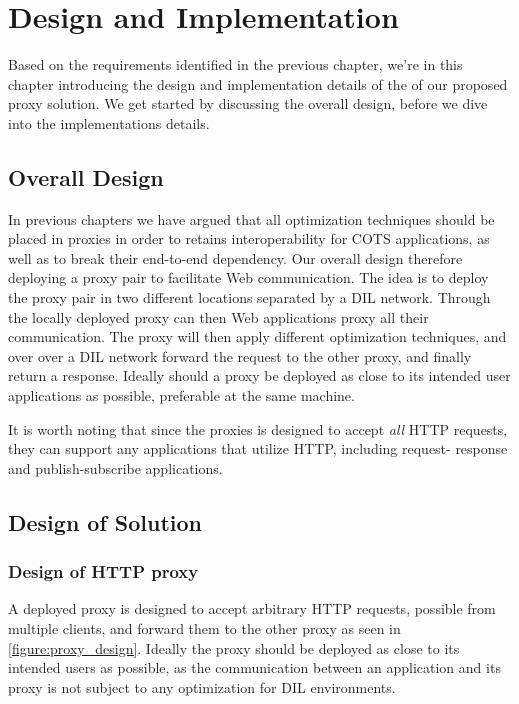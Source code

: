 \chapter{Design and Implementation}
\label{chapter:design}

Based on the requirements identified in the previous chapter, we're in this chapter introducing the design and implementation details of the of our proposed proxy solution. We get started by discussing the overall design, before we dive into the implementations details.

\section{Overall Design}

In previous chapters we have argued that all optimization techniques should be
placed in proxies in order to retains interoperability for COTS applications,
as well as to break their end-to-end dependency. Our overall design therefore
deploying a proxy pair to facilitate Web communication. The idea is to deploy
the proxy pair in two different locations separated by a DIL network. Through
the locally deployed proxy can then Web applications proxy all their
communication. The proxy will then apply different optimization
techniques, and over over a DIL network forward the request to the other proxy, and
finally return a response. Ideally should a proxy be deployed as close to its
intended user applications as possible, preferable at the same machine.


It is worth noting that since the proxies is designed to accept \textit{all} HTTP
requests, they can support any applications that utilize HTTP, including request-
response and publish-subscribe applications.

\section{Design of Solution}

\subsection{Design of HTTP proxy}

A deployed proxy is designed to accept arbitrary HTTP requests, possible from
multiple clients, and forward them to the other proxy as seen in
\cref{figure:proxy_design}. Ideally the proxy should be deployed as close to its
intended users as possible, as the communication between an application and its
proxy is not subject to any optimization for DIL environments.

